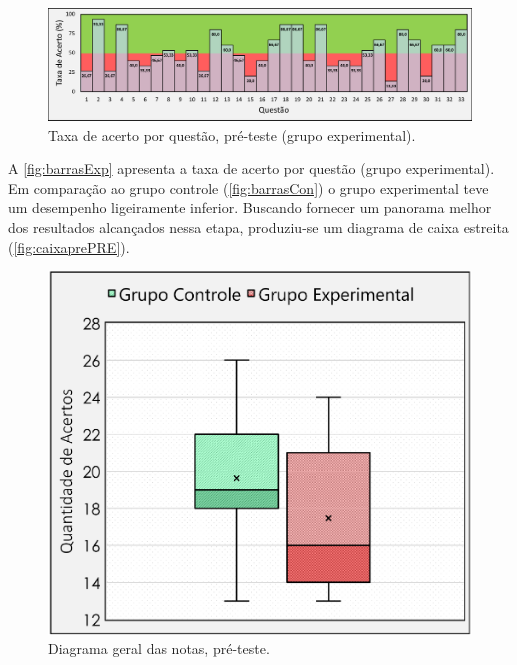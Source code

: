 \begin{figure}[htb]

    \caption{\label{fig:barrasExp}Taxa de acerto por questão, pré-teste (grupo experimental).}
    \includegraphics[width=\linewidth]{./Visuais/Notas3.pdf}
  
\end{figure}

A \autoref{fig:barrasExp} apresenta a taxa de acerto por questão (grupo experimental). Em comparação ao grupo controle (\autoref{fig:barrasCon}) o grupo experimental teve um desempenho ligeiramente inferior. Buscando fornecer um panorama melhor dos resultados alcançados nessa etapa, produziu-se um diagrama de caixa estreita (\autoref{fig:caixaprePRE}).

\begin{figure}%
    \vspace{-4pt}
    \caption{\label{fig:caixaprePRE}Diagrama geral das notas, pré-teste.}
    \includegraphics[width=\linewidth]{./Visuais/CaixaEstreitaEnfeitado.pdf}
\end{figure}

